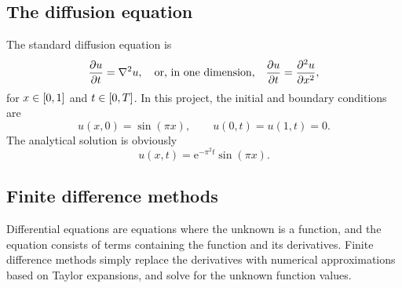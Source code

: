 \documentclass[11pt,british,a4paper]{article}
\renewcommand{\exp}[1]{\mathrm{e}^{#1}}
\numberwithin{equation}{section}
\begin{document}
\subsection{The diffusion equation}
The standard diffusion equation is
\begin{equation}
    \pdv{u}{t} = \nabla^2 u, \quad \text{or, in one dimension,}\quad \pdv{u}{t} = \pdv[2]{u}{x},
\end{equation}
for \(x\in\qty[0,1]\) and \(t\in\qty[0,T]\). In this project, the initial and boundary conditions are
\begin{equation}
    u(x,0) = \sin(\pi x), \qquad u(0,t) = u(1,t) = 0.
\end{equation}
The analytical solution is obviously
\begin{equation}
    u(x,t) = \exp{-\pi^2 t} \sin(\pi x).
\end{equation}


\subsection{Finite difference methods}
Differential equations are equations where the unknown is a function, and the equation consists of terms containing the function and its derivatives. Finite difference methods simply replace the derivatives with numerical approximations based on Taylor expansions, and solve for the unknown function values.
\end{document}

